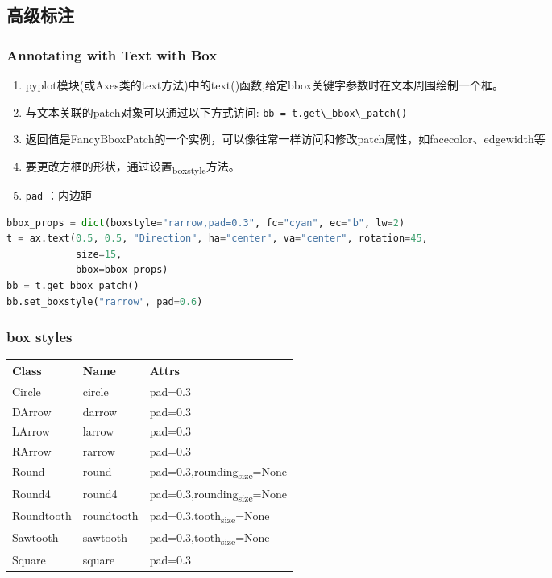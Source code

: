 \documentclass[UTF8,a4paper,12pt]{ctexart}  %
\providecommand{\tightlist}{\setlength{\itemsep}{0pt}\setlength{\parskip}{0pt}}
\newcommand{\passthrough}[1]{\lstset{mathescape=false}#1\lstset{mathescape=true}}
\begin{document}
\hypertarget{ux9ad8ux7ea7ux6807ux6ce8}{%
\subsection{高级标注}\label{ux9ad8ux7ea7ux6807ux6ce8}}

\hypertarget{annotating-with-text-with-box}{%
\subsubsection{Annotating with Text with Box}\label{annotating-with-text-with-box}}

\begin{enumerate}
\def\labelenumi{\arabic{enumi}.}
\tightlist
\item
  pyplot模块(或Axes类的text方法)中的text()函数,给定bbox关键字参数时在文本周围绘制一个框。
\item
  与文本关联的patch对象可以通过以下方式访问:
  \passthrough{\lstinline!bb = t.get\_bbox\_patch()!}
\item
  返回值是FancyBboxPatch的一个实例，可以像往常一样访问和修改patch属性，如facecolor、edgewidth等
\item
  要更改方框的形状，通过设置\textsubscript{boxstyle}方法。
\item
  \passthrough{\lstinline!pad!} ：内边距
\end{enumerate}

\begin{lstlisting}[language=Python]
bbox_props = dict(boxstyle="rarrow,pad=0.3", fc="cyan", ec="b", lw=2)
t = ax.text(0.5, 0.5, "Direction", ha="center", va="center", rotation=45,
            size=15,
            bbox=bbox_props)
bb = t.get_bbox_patch()
bb.set_boxstyle("rarrow", pad=0.6)
\end{lstlisting}

\hypertarget{box-styles}{%
\subsubsection{box styles}\label{box-styles}}

\begin{longtable}[]{@{}lll@{}}
\toprule
Class & Name & Attrs\tabularnewline
\midrule
\endhead
Circle & circle & pad=0.3\tabularnewline
DArrow & darrow & pad=0.3\tabularnewline
LArrow & larrow & pad=0.3\tabularnewline
RArrow & rarrow & pad=0.3\tabularnewline
Round & round & pad=0.3,rounding\textsubscript{size}=None\tabularnewline
Round4 & round4 & pad=0.3,rounding\textsubscript{size}=None\tabularnewline
Roundtooth & roundtooth & pad=0.3,tooth\textsubscript{size}=None\tabularnewline
Sawtooth & sawtooth & pad=0.3,tooth\textsubscript{size}=None\tabularnewline
Square & square & pad=0.3\tabularnewline
\bottomrule
\end{longtable}
\end{document}
